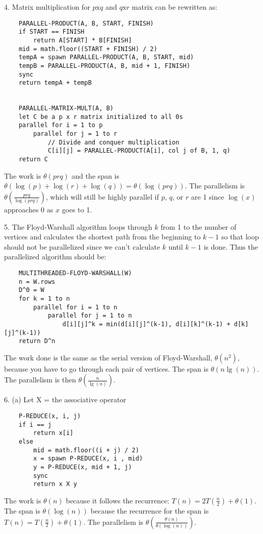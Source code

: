 \documentclass{article}
\begin{document}
4. Matrix multiplication for $p\text{x}q$ and $q\text{x}r$ matrix can be rewritten as:
\begin{lstlisting}
    PARALLEL-PRODUCT(A, B, START, FINISH)
    if START == FINISH
        return A[START] * B[FINISH]
    mid = math.floor((START + FINISH) / 2)
    tempA = spawn PARALLEL-PRODUCT(A, B, START, mid)
    tempB = PARALLEL-PRODUCT(A, B, mid + 1, FINISH)
    sync
    return tempA + tempB
    
    
    PARALLEL-MATRIX-MULT(A, B)
    let C be a p x r matrix initialized to all 0s
    parallel for i = 1 to p
        parallel for j = 1 to r
            // Divide and conquer multiplication
            C[i][j] = PARALLEL-PRODUCT(A[i], col j of B, 1, q)
    return C
\end{lstlisting}
The work is $\theta(prq)$ and the span is $\theta(\log(p) + \log(r) + \log(q)) = \theta(\log(prq))$. The parallelism is $\theta(\frac{prq}{\log(prq)})$, which will still be highly parallel if $p$, $q$, or $r$ are 1 since $\log(x)$ approaches 0 as $x$ goes to 1.

5. The Floyd-Warshall algorithm loops through $k$ from 1 to the number of vertices and calculates the shortest path from the beginning to $k-1$ so that loop should not be parallelized since we can't calculate $k$ until $k-1$ is done. Thus the parallelized algorithm should be:
\begin{lstlisting}
    MULTITHREADED-FLOYD-WARSHALL(W)
    n = W.rows
    D^0 = W
    for k = 1 to n
        parallel for i = 1 to n
            parallel for j = 1 to n
                d[i][j]^k = min(d[i][j]^(k-1), d[i][k]^(k-1) + d[k][j]^(k-1))
    return D^n
\end{lstlisting}
The work done is the same as the serial version of Floyd-Warshall, $\theta(n^2)$, because you have to go through each pair of vertices. The span is $\theta(n\lg(n))$. The parallelism is then $\theta(\frac{n}{\lg(n)})$.

6. (a) Let X = the associative operator
\begin{lstlisting}
    P-REDUCE(x, i, j)
    if i == j
        return x[i]
    else
        mid = math.floor((i + j) / 2)
        x = spawn P-REDUCE(x, i , mid)
        y = P-REDUCE(x, mid + 1, j)
        sync
        return x X y
\end{lstlisting}
The work is $\theta(n)$ because it follows the recurrence: $T(n) = 2T(\frac{n}{2}) + \theta(1)$. The span is $\theta(\log(n))$ because the recurrence for the span is $T(n) = T(\frac{n}{2}) + \theta(1)$. The parallelism is $\theta(\frac{\theta(n)}{\theta(\log(n))})$.
\end{document}
